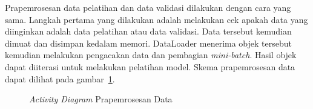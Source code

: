 Prapemrosesan data pelatihan dan data validasi dilakukan dengan cara yang sama. Langkah pertama
yang dilakukan adalah melakukan cek apakah data yang diinginkan adalah data pelatihan atau data
validasi. Data tersebut kemudian dimuat dan disimpan kedalam memori. DataLoader menerima objek
tersebut kemudian melakukan pengacakan data dan pembagian \textit{mini-batch}. Hasil objek dapat
diiterasi untuk melakukan pelatihan model. Skema prapemrosesan data dapat dilihat pada gambar~\ref{fig:act_diagram}.


\begin{figure}[htbp]
    \begin{center}
    \end{center}
    \vspace{-20pt}
    \captionsetup{labelfont=bf, textfont=bf}
    \caption{\textit{Activity Diagram} Prapemrosesan Data}
    \vspace{-10pt}
    \captionsetup{labelfont=md, textfont=md}
    \label{fig:act_diagram}
\end{figure}

